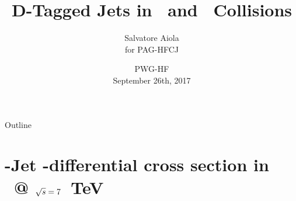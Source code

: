 \documentclass[xcolor={usenames,dvipsnames}]{beamer}
\title[D-Tagged Jets in \pp\ and \PbPb] %
{D-Tagged Jets in \pp\ and \PbPb\ Collisions}
\author[Salvatore Aiola]%
{Salvatore Aiola \\ for PAG-HFCJ}
\institute[Yale University] %
{Yale University}
\date[PWG-HF - Sept. 26th, 2017] %
{PWG-HF \\
September 26th, 2017}
\begin{document}
\begin{frame}
  \titlepage
\end{frame}

\begin{frame}{Outline}
   \tableofcontents
\end{frame}







\section{\Dzero-Jet \pt-differential cross section in \pp\ @ $\sqrt{s}=7$~TeV}
\end{document}
